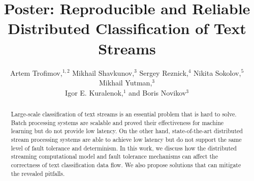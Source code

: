 \documentclass[sigconf]{acmart}
\theoremstyle{remark}
\begin{document}

\title {Poster: Reproducible and Reliable Distributed Classification of Text Streams}

\author{Artem Trofimov,$^ {1,2}$    Mikhail Shavkunov,$^3$    Sergey Reznick,$^4$     Nikita Sokolov,$^{5}$   Mikhail Yutman,$^3$ \\   Igor E. Kuralenok,$^1$    and  Boris Novikov$^ {3}$ }

\begin{abstract}

Large-scale classification of text streams is an essential problem that is hard to solve. Batch processing systems are scalable and proved their effectiveness for machine learning but do not provide low latency. On the other hand, state-of-the-art distributed stream processing systems are able to achieve low latency but do not support the same level of fault tolerance and determinism. In this work, we discuss how the distributed streaming computational model and fault tolerance mechanisms can affect the correctness of text classification data flow. We also propose solutions that can mitigate the revealed pitfalls.

\end{abstract}
\end{document}
